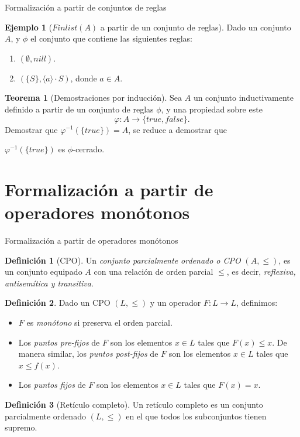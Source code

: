 \documentclass[dvipsnames, 8pt]{beamer} %
\theoremstyle{plain}
\theoremstyle{definition}
\newtheorem{teo}{Teorema}
\newtheorem{defi}{Definición}
\newtheorem{ejemplo}{Ejemplo}
\begin{document}
\begin{frame}{Formalización a partir de conjuntos de reglas}
    \begin{ejemplo}[$Finlist(A)$ a partir de un conjunto de reglas]
        Dado un conjunto $A$, y $\phi$ el conjunto que contiene las siguientes reglas:
        \begin{enumerate}
            \item $(\emptyset, nill)$.\pause
            \item $(\{S\},\langle a \rangle\cdot S)$, donde $a \in A$.
        \end{enumerate}\pause
    \end{ejemplo}
    \begin{teo}[Demostraciones por inducción]
        Sea $A$ un conjunto inductivamente definido a partir de un conjunto de reglas $\phi$, y una propiedad sobre este 
        $$\varphi : A \rightarrow \{true, false\}.$$ 
        Demostrar que $\varphi^{-1}(\{true\}) = A$, se reduce a demostrar que 
        \begin{center}
            $\varphi^{-1}(\{true\})$ es $\phi$-cerrado.
        \end{center}
    \end{teo}
\end{frame}

\section{Formalización a partir de operadores monótonos}
\begin{frame}{Formalización a partir de operadores monótonos}
    \begin{defi}[CPO]
        Un \emph{conjunto parcialmente ordenado o CPO} $(A,\leq)$, es un conjunto equipado $A$ con una relación de orden parcial $\leq$, es decir, \emph{reflexiva, antisemítica y transitiva}.
    \end{defi}\pause

    \begin{defi}
        Dado un CPO $(L, \leq)$ y un operador $F: L \rightarrow L$, definimos:\pause
        \begin{itemize}
            \item $F$ es \emph{monótono} si preserva el orden parcial.\pause
            \item Los \emph{puntos pre-fijos} de $F$ son los elementos $x \in L$ tales que $F(x) \leq x$. De manera similar, los \emph{puntos post-fijos} de $F$ son los elementos $x \in L$ tales que $x \leq f(x)$.\pause
            \item Los \emph{puntos fijos} de $F$ son los elementos $x \in L$ tales que $F(x) = x$.
        \end{itemize}
    \end{defi}\pause
    \begin{defi}[Retículo completo]
        Un retículo completo es un conjunto parcialmente ordenado $(L,\leq)$ en el que todos los subconjuntos tienen supremo.\pause
    \end{defi}
\end{frame}
\end{document}
